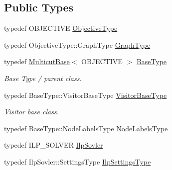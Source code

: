 \subsection*{Public Types}
\begin{DoxyCompactItemize}
\item 
typedef O\+B\+J\+E\+C\+T\+I\+VE \hyperlink{classnifty_1_1graph_1_1opt_1_1multicut_1_1MulticutIlp_acd5485d2d20d1e89c5202fc677993d5a}{Objective\+Type}
\item 
typedef Objective\+Type\+::\+Graph\+Type \hyperlink{classnifty_1_1graph_1_1opt_1_1multicut_1_1MulticutIlp_ad4b2bd31ae2f6630209a652942828640}{Graph\+Type}
\item 
typedef \hyperlink{classnifty_1_1graph_1_1opt_1_1multicut_1_1MulticutBase}{Multicut\+Base}$<$ O\+B\+J\+E\+C\+T\+I\+VE $>$ \hyperlink{classnifty_1_1graph_1_1opt_1_1multicut_1_1MulticutIlp_ab44311fd7237175157306abd3325825a}{Base\+Type}
\begin{DoxyCompactList}\small\item\em Base Type / parent class. \end{DoxyCompactList}\item 
typedef Base\+Type\+::\+Visitor\+Base\+Type \hyperlink{classnifty_1_1graph_1_1opt_1_1multicut_1_1MulticutIlp_a0fccd157c0176cba9c08f877b3798437}{Visitor\+Base\+Type}
\begin{DoxyCompactList}\small\item\em Visitor base class. \end{DoxyCompactList}\item 
typedef Base\+Type\+::\+Node\+Labels\+Type \hyperlink{classnifty_1_1graph_1_1opt_1_1multicut_1_1MulticutIlp_a0e1396c7332495a1d4af41e5df69398b}{Node\+Labels\+Type}
\item 
typedef I\+L\+P\+\_\+\+S\+O\+L\+V\+ER \hyperlink{classnifty_1_1graph_1_1opt_1_1multicut_1_1MulticutIlp_a981964ae77e95e0f0754ab51df67f6a5}{Ilp\+Sovler}
\item 
typedef Ilp\+Sovler\+::\+Settings\+Type \hyperlink{classnifty_1_1graph_1_1opt_1_1multicut_1_1MulticutIlp_ad46bf56538766a3bbf4d5783727e1e7c}{Ilp\+Settings\+Type}
\end{DoxyCompactItemize}
